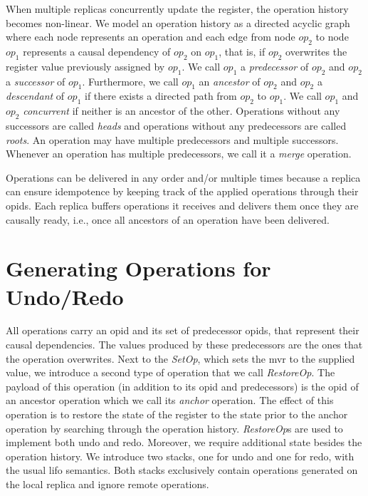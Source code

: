 \documentclass[sigplan,10pt]{acmart}
\newcommand{\op}[3][op]{$\mathit{#1}_{#2}^{#3}$} %
\newcommand{\setopkind}{\textit{SetOp}}
\newcommand{\restopkind}{\textit{RestoreOp}}
\begin{document}
When multiple replicas concurrently update the register,
the operation history becomes non-linear.
We model an operation history as a directed acyclic graph
where each node represents an operation and 
each edge from node \op{2}{} to node \op{1}{}
represents a causal dependency of \op{2}{} on \op{1}{}, that is, if
\op{2}{} overwrites the register value previously assigned by \op{1}{}.
We call \op{1}{} a \emph{predecessor} of \op{2}{} and
\op{2}{} a \emph{successor} of \op{1}{}.
Furthermore, we call \op{1}{} an \emph{ancestor} of \op{2}{} and
\op{2}{} a \emph{descendant} of \op{1}{} if there exists a directed
path from \op{2}{} to \op{1}{}.
We call \op{1}{} and \op{2}{} \emph{concurrent} if neither is an ancestor of the
other.
Operations without any successors are called \emph{heads} and
operations without any predecessors are called \emph{roots}.
An operation may have multiple predecessors and multiple successors.
Whenever an operation has multiple predecessors, we call it a \emph{merge} operation.

Operations can be delivered in any order and/or multiple
times because a replica can ensure idempotence by
keeping track of the applied operations through their \glspl*{opid}.
Each replica buffers operations it receives and delivers them
once they are causally ready, i.e., once all ancestors of an operation
have been delivered.

\section{Generating Operations for Undo/Redo}\label{sec:overview}

All operations carry an \gls*{opid} and its set of predecessor \glspl*{opid},
that represent their causal dependencies.
The values produced by these predecessors are the ones that the operation
overwrites.
Next to the \setopkind{}, which sets the \gls{mvr} to the supplied value,
we introduce a second type of operation that we call \restopkind{}.
The payload of this operation (in addition to its \gls*{opid} and predecessors)
is the \gls*{opid} of an ancestor operation which we call its
\emph{anchor} operation.
The effect of this operation is to restore the state of the register to the
state prior to the anchor operation by searching through the operation history.
\restopkind{}s are used to implement both undo and redo.
Moreover, we require additional state besides the operation history.
We introduce two stacks, one for undo and one for redo, with the usual
\acrlong{lifo} semantics.
Both stacks exclusively contain operations generated on the local replica and
ignore remote operations.
\end{document}
